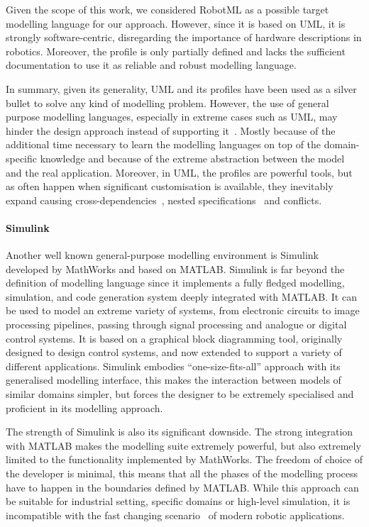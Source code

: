 Given the scope of this work, we considered RobotML as a possible target modelling language for our approach. However, since it is based on UML, it is strongly software-centric, disregarding the importance of hardware descriptions in robotics. Moreover, the profile is only partially defined and lacks the sufficient documentation to use it as reliable and robust modelling language.

In summary, given its generality, UML and its profiles have been used as a silver bullet to solve any kind of modelling problem. However, the use of general purpose modelling languages, especially in extreme cases such as UML, may hinder the design approach instead of supporting it~\cite{simons199930, bonnet2016not}. Mostly because of the additional time necessary to learn the modelling languages on top of the domain-specific knowledge and because of the extreme abstraction between the model and the real application. Moreover, in UML, the profiles are powerful tools, but as often happen when significant customisation is available, they inevitably expand causing cross-dependencies~\cite{espinoza2009challenges}, nested specifications~\cite{faugere2007marte} and conflicts.

\paragraph{Simulink} Another well known general-purpose modelling environment is Simulink~\cite{dabney2004mastering} developed by MathWorks and based on MATLAB. Simulink is far beyond the definition of modelling language since it implements a fully fledged modelling, simulation, and code generation system deeply integrated with MATLAB. It can be used to model an extreme variety of systems, from electronic circuits to image processing pipelines, passing through signal processing and analogue or digital control systems. It is based on a graphical block diagramming tool, originally designed to design control systems, and now extended to support a variety of different applications. Simulink embodies ``one-size-fits-all'' approach with its generalised modelling interface, this makes the interaction between models of similar domains simpler, but forces the designer to be extremely specialised and proficient in its modelling approach.

The strength of Simulink is also its significant downside. The strong integration with MATLAB makes the modelling suite extremely powerful, but also extremely limited to the functionality implemented by MathWorks. The freedom of choice of the developer is minimal, this means that all the phases of the modelling process have to happen in the boundaries defined by MATLAB. While this approach can be suitable for industrial setting, specific domains or high-level simulation, it is incompatible with the fast changing scenario~\cite{cousins2011exponential} of modern robotic applications.

